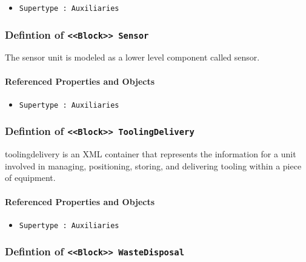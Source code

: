 \begin{itemize}
\item \texttt{Supertype : Auxiliaries}

\end{itemize}
\FloatBarrier
\subsubsection{Defintion of \texttt{<<Block>> Sensor}}
  \label{type:Sensor}

\FloatBarrier

The sensor unit is modeled as a lower level component called sensor.

\FloatBarrier
\paragraph{Referenced Properties and Objects}

\begin{itemize}
\item \texttt{Supertype : Auxiliaries}

\end{itemize}
\FloatBarrier
\subsubsection{Defintion of \texttt{<<Block>> ToolingDelivery}}
  \label{type:ToolingDelivery}

\FloatBarrier

toolingdelivery is an XML container that represents the information for a unit involved in managing, positioning, storing, and delivering tooling within a piece of equipment.


\FloatBarrier
\paragraph{Referenced Properties and Objects}

\begin{itemize}
\item \texttt{Supertype : Auxiliaries}

\end{itemize}
\FloatBarrier
\subsubsection{Defintion of \texttt{<<Block>> WasteDisposal}}
  \label{type:WasteDisposal}

\FloatBarrier

